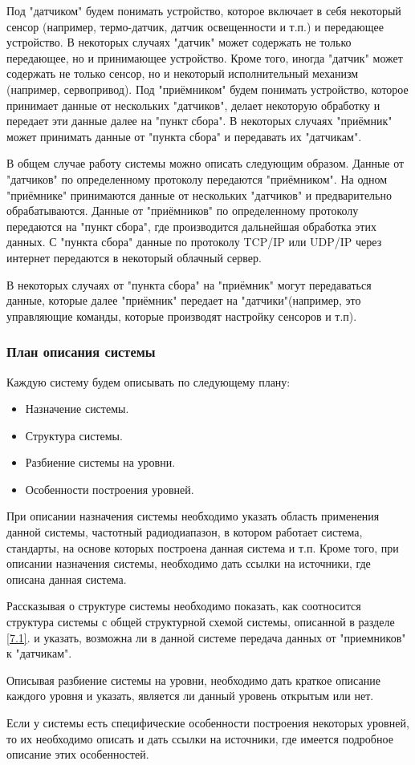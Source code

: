 Под "датчиком" будем понимать устройство, которое включает в себя некоторый сенсор (например, термо-датчик, датчик освещенности и т.п.) и передающее устройство. В некоторых случаях "датчик" может содержать не только передающее, но и принимающее устройство. Кроме того, иногда "датчик" может содержать не только сенсор, но и некоторый исполнительный механизм (например, сервопривод). Под "приёмником" будем понимать устройство, которое принимает данные от нескольких "датчиков", делает некоторую обработку и передает эти данные далее на "пункт сбора". В некоторых случаях "приёмник" может принимать данные от "пункта сбора" и передавать их "датчикам".

В общем случае работу системы можно описать следующим образом. Данные от "датчиков" по определенному протоколу передаются "приёмником".
На одном "приёмнике" принимаются данные от нескольких "датчиков" и предварительно обрабатываются. Данные от "приёмников" по определенному протоколу передаются на "пункт сбора", где производится дальнейшая обработка этих данных. С "пункта сбора" данные по протоколу TCP/IP или UDP/IP через интернет передаются в некоторый облачный сервер.

В некоторых случаях от "пункта сбора" на "приёмник" могут передаваться данные, которые далее "приёмник" передает на "датчики"(например, это управляющие команды, которые производят настройку сенсоров и т.п).  
\subsubsection{План описания системы}
Каждую систему будем описывать по следующему плану:
\begin{itemize}
	\item Назначение системы.
	\item Структура системы. 
	\item Разбиение системы на уровни.
	\item Особенности построения уровней.
\end{itemize}
При описании назначения системы необходимо указать область применения данной системы, частотный радиодиапазон, в котором работает система, стандарты, на основе которых построена данная система и т.п. Кроме того, при описании назначения системы, необходимо дать ссылки на источники, где описана данная система. 

Рассказывая о структуре системы необходимо показать, как соотносится структура системы с общей структурной схемой системы,
описанной в разделе \ref{7.1}.
и указать, возможна ли в данной системе передача данных от "приемников" к "датчикам".    

Описывая  разбиение системы на уровни, необходимо дать краткое описание каждого уровня и указать, является ли данный уровень открытым или нет.

Если у системы есть специфические особенности построения некоторых уровней, то их необходимо описать и дать ссылки на источники, где имеется подробное описание этих особенностей.
